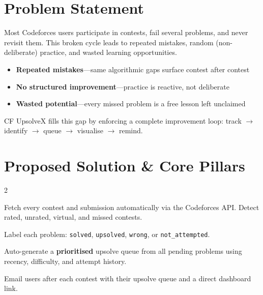 \documentclass[11pt, a4paper]{article}
\begin{document}
\section{Problem Statement}

Most Codeforces users participate in contests, fail several problems, and
never revisit them. This broken cycle leads to repeated mistakes, random
(non-deliberate) practice, and wasted learning opportunities.

\begin{warningbox}
  \begin{itemize}
    \item \textbf{Repeated mistakes}---same algorithmic gaps surface contest after contest
    \item \textbf{No structured improvement}---practice is reactive, not deliberate
    \item \textbf{Wasted potential}---every missed problem is a free lesson left unclaimed
  \end{itemize}
\end{warningbox}

CF UpsolveX fills this gap by enforcing a complete improvement loop:
track $\rightarrow$ identify $\rightarrow$ queue $\rightarrow$ visualise $\rightarrow$ remind.

\section{Proposed Solution \& Core Pillars}

\begin{multicols}{2}
  \begin{successbox}[Track]
    Fetch every contest and submission automatically via the Codeforces API.
    Detect rated, unrated, virtual, and missed contests.
  \end{successbox}
  \begin{successbox}[Identify]
    Label each problem: \texttt{solved}, \texttt{upsolved},
    \texttt{wrong}, or \texttt{not\_attempted}.
  \end{successbox}
  \columnbreak
  \begin{successbox}[Queue]
    Auto-generate a \textbf{prioritised} upsolve queue from all pending problems
    using recency, difficulty, and attempt history.
  \end{successbox}
  \begin{successbox}[Remind]
    Email users after each contest with their upsolve queue and a direct dashboard link.
  \end{successbox}
\end{multicols}
\end{document}
